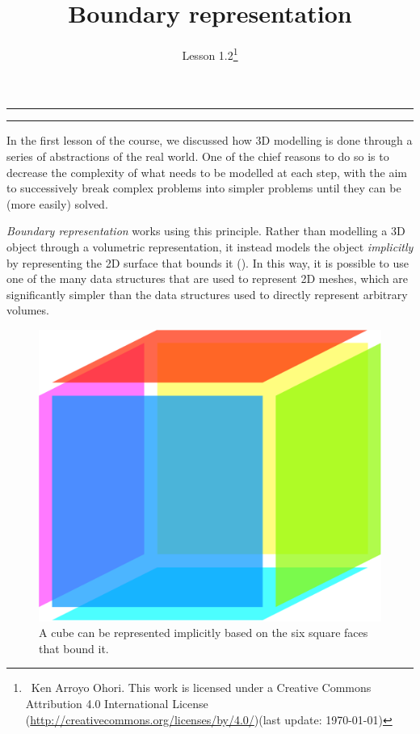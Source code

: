 
\newcommand{\lessonNumber}{Lesson 1.2}

\newtheorem{definition}{Definition}

\title{Boundary representation}


\ohead*{\lessonNumber}
\titlehead{\thispagestyle{headings}}
\author{\lessonNumber\footnote{\ccbysa\ Ken Arroyo Ohori. This work is licensed under a Creative Commons Attribution 4.0 International License (\url{http://creativecommons.org/licenses/by/4.0/})\newline(last update: \today)}}
\date{}

\pagestyle{scrheadings}

\maketitle

\noindent\rule{5cm}{0.4pt}
\tableofcontents
\noindent\rule{5cm}{0.4pt}
\vspace{5mm}


In the first lesson of the course, we discussed how 3D modelling is done through a series of abstractions of the real world.
One of the chief reasons to do so is to decrease the complexity of what needs to be modelled at each step, with the aim to successively break complex problems into simpler problems until they can be (more easily) solved.

\emph{Boundary representation} works using this principle.
Rather than modelling a 3D object through a volumetric representation, it instead models the object \emph{implicitly} by representing the 2D surface that bounds it ().
In this way, it is possible to use one of the many data structures that are used to represent 2D meshes, which are significantly simpler than the data structures used to directly represent arbitrary volumes.

\begin{figure}
\centering
\includegraphics[width=0.4\linewidth]{figs/cube.pdf}
\caption{A cube can be represented implicitly based on the six square faces that bound it.}%
\label{fig:cube}
\end{figure}

